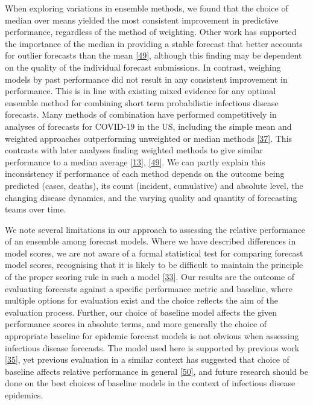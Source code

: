 \documentclass[
]{article}
\begin{document}
When exploring variations in ensemble methods, we found that the choice of median over means yielded the most consistent improvement in predictive performance, regardless of the method of weighting. Other work has supported the importance of the median in providing a stable forecast that better accounts for outlier forecasts than the mean \protect\hyperlink{ref-brooksComparingEnsembleApproaches2020}{{[}49{]}}, although this finding may be dependent on the quality of the individual forecast submissions. In contrast, weighing models by past performance did not result in any consistent improvement in performance. This is in line with existing mixed evidence for any optimal ensemble method for combining short term probabilistic infectious disease forecasts. Many methods of combination have performed competitively in analyses of forecasts for COVID-19 in the US, including the simple mean and weighted approaches outperforming unweighted or median methods \protect\hyperlink{ref-taylorCombiningProbabilisticForecasts2021}{{[}37{]}}. This contrasts with later analyses finding weighted methods to give similar performance to a median average \protect\hyperlink{ref-rayEnsembleForecastsCoronavirus2020e}{{[}13{]}}, \protect\hyperlink{ref-brooksComparingEnsembleApproaches2020}{{[}49{]}}. We can partly explain this inconsistency if performance of each method depends on the outcome being predicted (cases, deaths), its count (incident, cumulative) and absolute level, the changing disease dynamics, and the varying quality and quantity of forecasting teams over time.

We note several limitations in our approach to assessing the relative performance of an ensemble among forecast models. Where we have described differences in model scores, we are not aware of a formal statistical test for comparing forecast model scores, recognising that it is likely to be difficult to maintain the principle of the proper scoring rule in such a model \protect\hyperlink{ref-bracherEvaluatingEpidemicForecasts2021}{{[}33{]}}. Our results are the outcome of evaluating forecasts against a specific performance metric and baseline, where multiple options for evaluation exist and the choice reflects the aim of the evaluation process. Further, our choice of baseline model affects the given performance scores in absolute terms, and more generally the choice of appropriate baseline for epidemic forecast models is not obvious when assessing infectious disease forecasts. The model used here is supported by previous work \protect\hyperlink{ref-cramerEvaluationIndividualEnsemble2021}{{[}35{]}}, yet previous evaluation in a similar context has suggested that choice of baseline affects relative performance in general \protect\hyperlink{ref-bracherNationalSubnationalShortterm2021}{{[}50{]}}, and future research should be done on the best choices of baseline models in the context of infectious disease epidemics.
\end{document}
